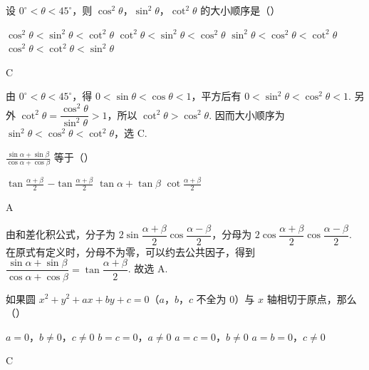 \documentclass[UTF8,a4paper,oneside,11pt]{ctexbook}
\begin{document}
\begin{problem}
设 \(0^\circ<\theta<45^\circ\)，则 \(\cos^2\theta\)，\(\sin^2\theta\)，\(\cot^2\theta\) 的大小顺序是（\quad）

\choices
    {\(\cos^2\theta<\sin^2\theta<\cot^2\theta\)}
    {\(\cot^2\theta<\sin^2\theta<\cos^2\theta\)}
    {\(\sin^2\theta<\cos^2\theta<\cot^2\theta\)}
    {\(\cos^2\theta<\cot^2\theta<\sin^2\theta\)}
\end{problem}

\begin{answer}
C
\end{answer}

\begin{solution}
由 \(0^\circ<\theta<45^\circ\)，得 \(0<\sin\theta<\cos\theta<1\)，平方后有 \(0<\sin^2\theta<\cos^2\theta<1\). 另外 \(\cot^2\theta=\dfrac{\cos^2\theta}{\sin^2\theta}>1\)，所以 \(\cot^2\theta>\cos^2\theta\). 因而大小顺序为 \(\sin^2\theta<\cos^2\theta<\cot^2\theta\)，选 C.
\end{solution}

\begin{problem}
\(\frac{\sin\alpha+\sin\beta}{\cos\alpha+\cos\beta}\) 等于（\quad）

\choices
    {\(\tan\frac{\alpha+\beta}{2}\)}
    {\(-\tan\frac{\alpha+\beta}{2}\)}
    {\(\tan\alpha+\tan\beta\)}
    {\(\cot\frac{\alpha+\beta}{2}\)}
\end{problem}

\begin{answer}
A
\end{answer}

\begin{solution}
由和差化积公式，分子为 \(2\sin\dfrac{\alpha+\beta}{2}\cos\dfrac{\alpha-\beta}{2}\)，分母为 \(2\cos\dfrac{\alpha+\beta}{2}\cos\dfrac{\alpha-\beta}{2}\). 在原式有定义时，分母不为零，可以约去公共因子，得到
\(\dfrac{\sin\alpha+\sin\beta}{\cos\alpha+\cos\beta}=\tan\dfrac{\alpha+\beta}{2}\). 故选 A.
\end{solution}

\begin{problem}
如果圆 \(x^2+y^2+ax+by+c=0\)（\(a\)，\(b\)，\(c\) 不全为 \(0\)）与 \(x\) 轴相切于原点，那么（\quad）

\choices
    {\(a=0\)，\(b\neq 0\)，\(c\neq 0\)}
    {\(b=c=0\)，\(a\neq 0\)}
    {\(a=c=0\)，\(b\neq 0\)}
    {\(a=b=0\)，\(c\neq 0\)}
\end{problem}

\begin{answer}
C
\end{answer}
\end{document}
